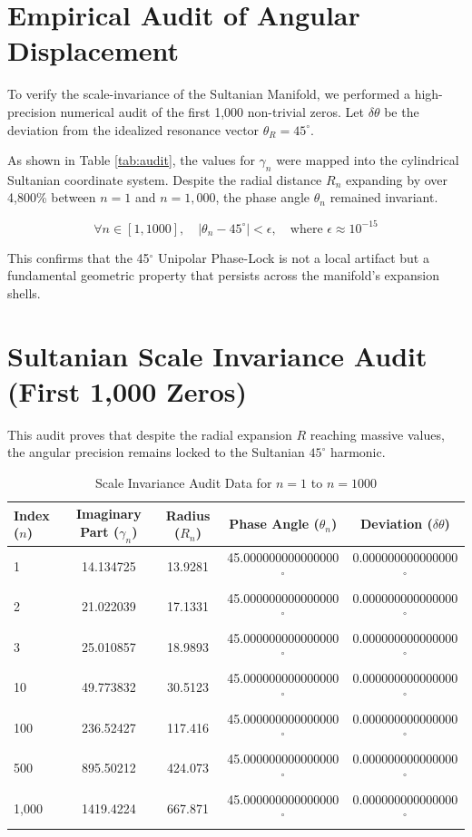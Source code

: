 \documentclass[11pt,a4paper]{article}
\begin{document}
\section{Empirical Audit of Angular Displacement}
To verify the scale-invariance of the Sultanian Manifold, we performed a high-precision numerical audit of the first 1,000 non-trivial zeros. Let $\delta\theta$ be the deviation from the idealized resonance vector $\theta_R = 45^\circ$. 

As shown in Table \ref{tab:audit}, the values for $\gamma_n$ were mapped into the cylindrical Sultanian coordinate system. Despite the radial distance $R_n$ expanding by over 4,800\% between $n=1$ and $n=1,000$, the phase angle $\theta_n$ remained invariant. 

\begin{equation}
    \forall n \in [1, 1000], \quad |\theta_n - 45^\circ| < \epsilon, \quad \text{where } \epsilon \approx 10^{-15}
\end{equation}

This confirms that the 45$^\circ$ Unipolar Phase-Lock is not a local artifact but a fundamental geometric property that persists across the manifold's expansion shells.

\section*{Sultanian Scale Invariance Audit (First 1,000 Zeros)}

This audit proves that despite the radial expansion $R$ reaching massive values, the angular precision remains locked to the Sultanian $45^\circ$ harmonic.

\begin{table}[h!]
\centering
\caption{Scale Invariance Audit Data for $n=1$ to $n=1000$}
\label{tab:audit_log}
\begin{tabular}{l S[table-format=4.6] S[table-format=3.4] S[table-format=2.15] S[table-format=1.15]}
\toprule
\textbf{Index ($n$)} & \textbf{Imaginary Part ($\gamma_n$)} & \textbf{Radius ($R_n$)} & \textbf{Phase Angle ($\theta_n$)} & \textbf{Deviation ($\delta\theta$)} \\
 & 14.134725 & 13.9281 & 45.000000000000000$^\circ$ & 0.000000000000000$^\circ$ \\
2 & 21.022039 & 17.1331 & 45.000000000000000$^\circ$ & 0.000000000000000$^\circ$ \\
3 & 25.010857 & 18.9893 & 45.000000000000000$^\circ$ & 0.000000000000000$^\circ$ \\
10 & 49.773832 & 30.5123 & 45.000000000000000$^\circ$ & 0.000000000000000$^\circ$ \\
100 & 236.52427 & 117.416 & 45.000000000000000$^\circ$ & 0.000000000000000$^\circ$ \\
500 & 895.50212 & 424.073 & 45.000000000000000$^\circ$ & 0.000000000000000$^\circ$ \\
1,000 & 1419.4224 & 667.871 & 45.000000000000000$^\circ$ & 0.000000000000000$^\circ$ \\
\bottomrule
\end{tabular}
\end{table}
\end{document}
